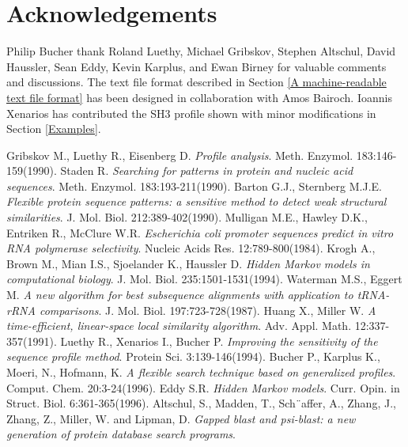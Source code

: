 \documentclass[a4paper,10pt,twoside]{scrartcl}
\begin{document}
\section*{Acknowledgements}
  Philip Bucher thank Roland Luethy, Michael Gribskov, Stephen Altschul, David Haussler, Sean Eddy, Kevin Karplus, and Ewan Birney for valuable
  comments and discussions. The text file format described in Section \ref{A machine-readable text file format} has been designed in collaboration with Amos Bairoch.
  Ioannis Xenarios has contributed the SH3 profile shown with minor modifications in Section \ref{Examples}.

\begin{thebibliography}{9}
   Gribskov M., Luethy R., Eisenberg D.
   \emph{Profile analysis}.
   Meth. Enzymol. 183:146-159(1990).
   Staden R.
   \emph{Searching for patterns in protein and nucleic acid sequences}.
   Meth. Enzymol. 183:193-211(1990).
   Barton G.J., Sternberg M.J.E.
   \emph{Flexible protein sequence patterns: a sensitive method to detect weak
   structural similarities}.
   J. Mol. Biol. 212:389-402(1990).
   Mulligan M.E., Hawley D.K., Entriken R., McClure W.R.
   \emph{Escherichia coli promoter sequences predict in vitro RNA polymerase
   selectivity}.
   Nucleic Acids Res. 12:789-800(1984).
   Krogh A., Brown M., Mian I.S., Sjoelander K., Haussler D.
   \emph{Hidden Markov models in computational biology}.
   J. Mol. Biol. 235:1501-1531(1994).
   Waterman M.S., Eggert M.
   \emph{A new algorithm for best subsequence alignments with application to
   tRNA-rRNA comparisons}.
   J. Mol. Biol. 197:723-728(1987).
   Huang X., Miller W.
   \emph{A time-efficient, linear-space local similarity algorithm}.
   Adv. Appl. Math. 12:337-357(1991).
   Luethy R., Xenarios I., Bucher P.
   \emph{Improving the sensitivity of the sequence profile method}.
   Protein Sci. 3:139-146(1994).
   Bucher P., Karplus K., Moeri, N., Hofmann, K.
   \emph{A flexible search technique based on generalized profiles}.
   Comput. Chem. 20:3-24(1996).
   Eddy S.R.
   \emph{Hidden Markov models}.
   Curr. Opin. in Struct. Biol. 6:361-365(1996).
   Altschul, S., Madden, T., Sch¨affer, A., Zhang, J., Zhang, Z., Miller, W. and Lipman, D.
   \emph{Gapped blast and psi-blast: a new generation of protein database search programs}.

\end{thebibliography}
\end{document}
